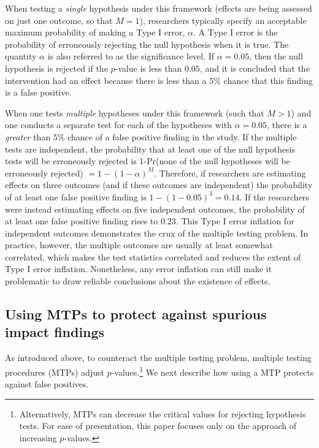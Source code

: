\documentclass[
]{article}
\begin{document}
When testing a \emph{single} hypothesis under this framework (effects
are being assessed on just one outcome, so that \(M=1\)), researchers
typically specify an acceptable maximum probability of making a Type I
error, \(\alpha\). A Type I error is the probability of erroneously
rejecting the null hypothesis when it is true. The quantity \(\alpha\)
is also referred to as the significance level. If \(\alpha=0.05\), then
the null hypothesis is rejected if the \(p\)-value is less than
\(0.05\), and it is concluded that the intervention had an effect
because there is less than a \(5\)\% chance that this finding is a false
positive.

When one tests \emph{multiple} hypotheses under this framework (such
that \(M>1\)) and one conducts a separate test for each of the
hypotheses with \(\alpha=0.05\), there is a \emph{greater} than \(5\%\)
chance of a false positive finding in the study. If the multiple tests
are independent, the probability that at least one of the null
hypothesis tests will be erroneously rejected is 1-Pr(none of the null
hypotheses will be erroneously rejected) \(= 1-(1-\alpha)^M\).
Therefore, if researchers are estimating effects on three outcomes (and
if these outcomes are independent) the probability of at least one false
positive finding is \(1-(1-0.05)^3=0.14\). If the researchers were
instead estimating effects on five independent outcomes, the probability
of at least one false positive finding rises to \(0.23\). This Type I
error inflation for independent outcomes demonstrates the crux of the
multiple testing problem. In practice, however, the multiple outcomes
are usually at least somewhat correlated, which makes the test
statistics correlated and reduces the extent of Type I error inflation.
Nonetheless, any error inflation can still make it problematic to draw
reliable conclusions about the existence of effects.

\subsection{Using MTPs to protect against spurious impact findings}
\label{sec:mtp_use}

As introduced above, to counteract the multiple testing problem,
multiple testing procedures (MTPs) adjust
\(p\)-values.\footnote{Alternatively, MTPs can decrease the critical values for rejecting hypothesis tests. For ease of presentation, this paper focuses only on the approach of increasing $p$-values.}
We next describe how using a MTP protects against false positives.
\end{document}
